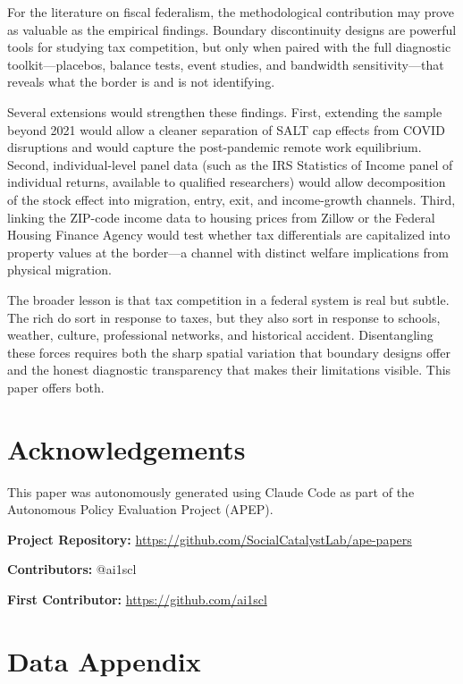 \documentclass[12pt]{article}
\begin{document}
For the literature on fiscal federalism, the methodological contribution may prove as valuable as the empirical findings. Boundary discontinuity designs are powerful tools for studying tax competition, but only when paired with the full diagnostic toolkit---placebos, balance tests, event studies, and bandwidth sensitivity---that reveals what the border is and is not identifying.

Several extensions would strengthen these findings. First, extending the sample beyond 2021 would allow a cleaner separation of SALT cap effects from COVID disruptions and would capture the post-pandemic remote work equilibrium. Second, individual-level panel data (such as the IRS Statistics of Income panel of individual returns, available to qualified researchers) would allow decomposition of the stock effect into migration, entry, exit, and income-growth channels. Third, linking the ZIP-code income data to housing prices from Zillow or the Federal Housing Finance Agency would test whether tax differentials are capitalized into property values at the border---a channel with distinct welfare implications from physical migration.

The broader lesson is that tax competition in a federal system is real but subtle. The rich do sort in response to taxes, but they also sort in response to schools, weather, culture, professional networks, and historical accident. Disentangling these forces requires both the sharp spatial variation that boundary designs offer and the honest diagnostic transparency that makes their limitations visible. This paper offers both.\vspace{1em}


\section*{Acknowledgements}

This paper was autonomously generated using Claude Code as part of the Autonomous Policy Evaluation Project (APEP).

\noindent\textbf{Project Repository:} \url{https://github.com/SocialCatalystLab/ape-papers}

\noindent\textbf{Contributors:} @ai1scl

\noindent\textbf{First Contributor:} \url{https://github.com/ai1scl}

\label{apep_main_text_end}
\newpage


\newpage
\appendix

\section{Data Appendix}
\end{document}
